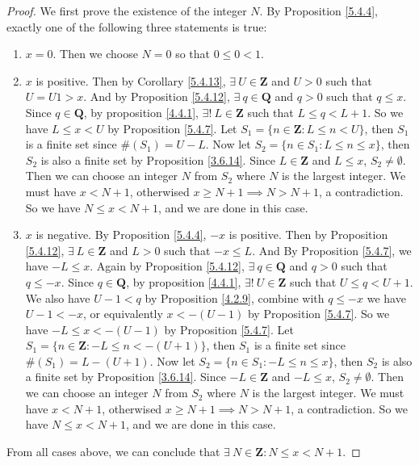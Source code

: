 \begin{proof}
We first prove the existence of the integer \(N\).
By Proposition \ref{5.4.4}, exactly one of the following three statements is true:
\begin{enumerate}
    \item \(x = 0\).
    Then we choose \(N = 0\) so that \(0 \leq 0 < 1\).
    \item \(x\) is positive.
    Then by Corollary \ref{5.4.13}, \(\exists\ U \in \mathbf{Z}\) and \(U > 0\) such that \(U = U1 > x\).
    And by Proposition \ref{5.4.12}, \(\exists\ q \in \mathbf{Q}\) and \(q > 0\) such that \(q \leq x\).
    Since \(q \in \mathbf{Q}\), by proposition \ref{4.4.1}, \(\exists!\ L \in \mathbf{Z}\) such that \(L \leq q < L + 1\).
    So we have \(L \leq x < U\) by Proposition \ref{5.4.7}.
    Let \(S_1 = \{n \in \mathbf{Z} : L \leq n < U\}\), then \(S_1\) is a finite set since \(\#(S_1) = U - L\).
    Now let \(S_2 = \{n \in S_1 : L \leq n \leq x\}\), then \(S_2\) is also a finite set by Proposition \ref{3.6.14}.
    Since \(L \in \mathbf{Z}\) and \(L \leq x\), \(S_2 \neq \emptyset\).
    Then we can choose an integer \(N\) from \(S_2\) where \(N\) is the largest integer.
    We must have \(x < N + 1\), otherwised \(x \geq N + 1 \implies N > N + 1\), a contradiction.
    So we have \(N \leq x < N + 1\), and we are done in this case.
    \item \(x\) is negative.
    By Proposition \ref{5.4.4}, \(-x\) is positive.
    Then by Proposition \ref{5.4.12}, \(\exists\ L \in \mathbf{Z}\) and \(L > 0\) such that \(-x \leq L\).
    And By Proposition \ref{5.4.7}, we have \(-L \leq x\).
    Again by Proposition \ref{5.4.12}, \(\exists\ q \in \mathbf{Q}\) and \(q > 0\) such that \(q \leq -x\).
    Since \(q \in \mathbf{Q}\), by proposition \ref{4.4.1}, \(\exists!\ U \in \mathbf{Z}\) such that \(U \leq q < U + 1\).
    We also have \(U - 1 < q\) by Proposition \ref{4.2.9}, combine with \(q \leq -x\) we have \(U - 1 < -x\), or equivalently \(x < -(U - 1)\) by Proposition \ref{5.4.7}.
    So we have \(-L \leq x < -(U - 1)\) by Proposition \ref{5.4.7}.
    Let \(S_1 = \{n \in \mathbf{Z} : -L \leq n < -(U + 1)\}\), then \(S_1\) is a finite set since \(\#(S_1) = L - (U + 1)\).
    Now let \(S_2 = \{n \in S_1 : -L \leq n \leq x\}\), then \(S_2\) is also a finite set by Proposition \ref{3.6.14}.
    Since \(-L \in \mathbf{Z}\) and \(-L \leq x\), \(S_2 \neq \emptyset\).
    Then we can choose an integer \(N\) from \(S_2\) where \(N\) is the largest integer.
    We must have \(x < N + 1\), otherwised \(x \geq N + 1 \implies N > N + 1\), a contradiction.
    So we have \(N \leq x < N + 1\), and we are done in this case.
\end{enumerate}
From all cases above, we can conclude that \(\exists\ N \in \mathbf{Z} : N \leq x < N + 1\).


\end{proof}
